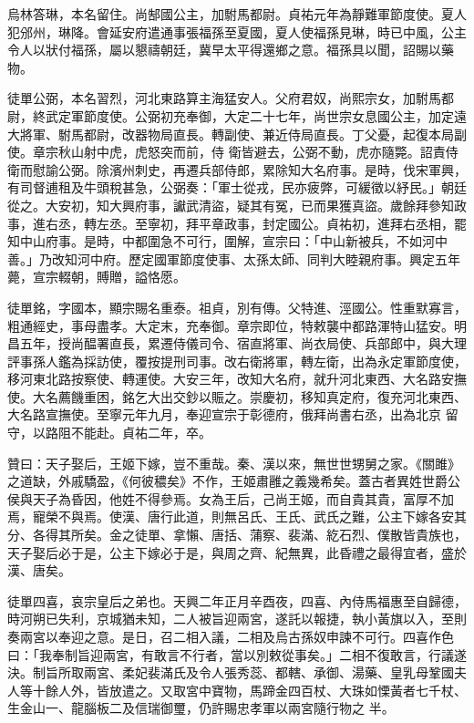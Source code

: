 \begin{pinyinscope}
 烏林答琳，本名留住。尚郜國公主，加駙馬都尉。貞祐元年為靜難軍節度使。夏人犯邠州，琳降。會延安府遣通事張福孫至夏國，夏人使福孫見琳，時已中風，公主令人以狀付福孫，屬以懇禱朝廷，冀早太平得還鄉之意。福孫具以聞，詔賜以藥物。



 徒單公弼，本名習烈，河北東路算主海猛安人。父府君奴，尚熙宗女，加駙馬都尉，終武定軍節度使。公弼初充奉御，大定二十七年，尚世宗女息國公主，加定遠大將軍、駙馬都尉，改器物局直長。轉副使、兼近侍局直長。丁父憂，起復本局副使。章宗秋山射中虎，虎怒突而前，侍
 衛皆避去，公弼不動，虎亦隨斃。詔責侍衛而慰諭公弼。除濱州刺史，再遷兵部侍郎，累除知大名府事。是時，伐宋軍興，有司督逋租及牛頭稅甚急，公弼奏：「軍士從戎，民亦疲弊，可緩徵以紓民。」朝廷從之。大安初，知大興府事，讞武清盜，疑其有冤，已而果獲真盜。歲餘拜參知政事，進右丞，轉左丞。至寧初，拜平章政事，封定國公。貞祐初，進拜右丞相，罷知中山府事。是時，中都圍急不可行，圍解，宣宗曰：「中山新被兵，不如河中善。」乃改知河中府。歷定國軍節度使事、太孫太師、同判大睦親府事。興定五年薨，宣宗輟朝，賻贈，謚恪愿。



 徒單銘，字國本，顯宗賜名重泰。祖貞，別有傳。父特進、涇國公。性重默寡言，粗通經史，事母盡孝。大定末，充奉御。章宗即位，特敕襲中都路渾特山猛安。明昌五年，授尚醖署直長，累遷侍儀司令、宿直將軍、尚衣局使、兵部郎中，與大理評事孫人鑑為採訪使，覆按提刑司事。改右衛將軍，轉左衛，出為永定軍節度使，移河東北路按察使、轉運使。大安三年，改知大名府，就升河北東西、大名路安撫使。大名薦饑重困，銘乞大出交鈔以賑之。崇慶初，移知真定府，復充河北東西、大名路宣撫使。至寧元年九月，奉迎宣宗于彰德府，俄拜尚書右丞，出為北京
 留守，以路阻不能赴。貞祐二年，卒。



 贊曰：天子娶后，王姬下嫁，豈不重哉。秦、漢以來，無世世甥舅之家。《關雎》之道缺，外戚驕盈，《何彼穠矣》不作，王姬肅雝之義幾希矣。蓋古者異姓世爵公侯與天子為昏因，他姓不得參焉。女為王后，己尚王姬，而自貴其貴，富厚不加焉，寵榮不與焉。使漢、唐行此道，則無呂氏、王氏、武氏之難，公主下嫁各安其分、各得其所矣。金之徒單、拿懶、唐括、蒲察、裴滿、紇石烈、僕散皆貴族也，天子娶后必于是，公主下嫁必于是，與周之齊、紀無異，此昏禮之最得宜者，盛於漢、唐矣。



 徒單四喜，哀宗皇后之弟也。天興二年正月辛酉夜，四喜、內侍馬福惠至自歸德，時河朔已失利，京城猶未知，二人被旨迎兩宮，遂託以報捷，執小黃旗以入，至則奏兩宮以奉迎之意。是日，召二相入議，二相及烏古孫奴申諫不可行。四喜作色曰：「我奉制旨迎兩宮，有敢言不行者，當以別敕從事矣。」二相不復敢言，行議遂決。制旨所取兩宮、柔妃裴滿氏及令人張秀蕊、都轄、承御、湯藥、皇乳母鞏國夫人等十餘人外，皆放遣之。又取宮中寶物，馬蹄金四百杖、大珠如慄黃者七千杖、生金山一、龍腦板二及信瑞御璽，仍許賜忠孝軍以兩宮隨行物之
 半。




\end{pinyinscope}

